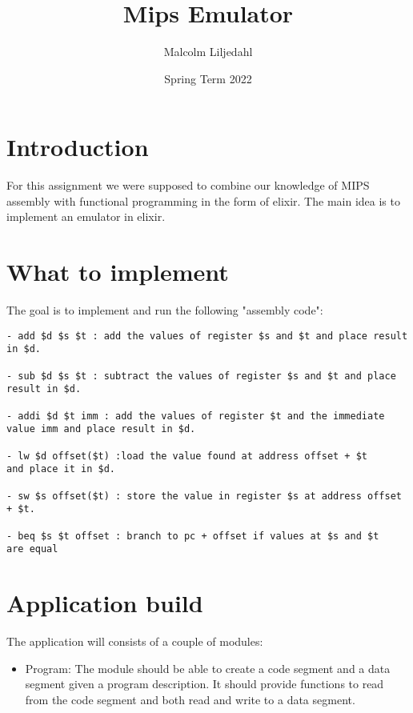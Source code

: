 \documentclass[a4paper,11pt]{article}
\begin{document}
\title{
    \textbf{Mips Emulator}
}
\author{Malcolm Liljedahl}
\date{Spring Term 2022}

\maketitle

\section*{Introduction}

For this assignment we were supposed to combine our knowledge of MIPS assembly with functional programming in the form of elixir. The main idea is to implement an emulator in elixir.

\section{What to implement}

The goal is to implement and run the following "assembly code":

\begin{verbatim}
- add $d $s $t : add the values of register $s and $t and place result
in $d.

- sub $d $s $t : subtract the values of register $s and $t and place
result in $d.

- addi $d $t imm : add the values of register $t and the immediate
value imm and place result in $d.

- lw $d offset($t) :load the value found at address offset + $t
and place it in $d.

- sw $s offset($t) : store the value in register $s at address offset
+ $t.

- beq $s $t offset : branch to pc + offset if values at $s and $t
are equal
\end{verbatim}


\section{Application build}

The application will consists of a couple of modules:

\begin{itemize}
\item Program: The module should be able to create a code segment and a
		data segment given a program description. It should provide functions
		to read from the code segment and both read and write to a data
		segment.
\end{itemize}
\end{document}
